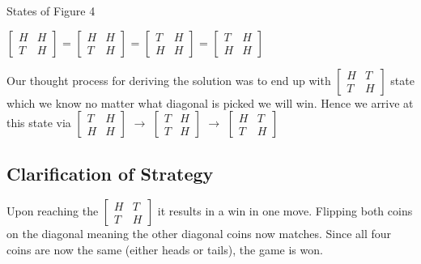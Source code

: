 \documentclass{article}
\begin{document}
\begin{center}
States of Figure 4
\end{center}
\begin{center} 
    $\begin{bmatrix}
        H & H \\
        T & H 
    \end{bmatrix}$
        =
    $\begin{bmatrix}
        H & H \\
        T & H 
    \end{bmatrix}$
        =
    $\begin{bmatrix}
        T & H \\
        H & H 
    \end{bmatrix}$
        =
    $\begin{bmatrix}
        T & H \\
        H & H 
    \end{bmatrix}$
\end{center}
Our thought process for deriving the solution was to end up with 
$\begin{bmatrix} 
        H & T \\
        T & H
        \end{bmatrix}$ state which we know no matter what diagonal is picked we will win. Hence we arrive at this state via $\begin{bmatrix}
        T & H \\
        H & H 
        \end{bmatrix}$ $\rightarrow$ $\begin{bmatrix} 

        T & H \\
        T & H 
        \end{bmatrix}$ $\rightarrow$  $\begin{bmatrix} 

        H & T \\
        T & H
        \end{bmatrix}$ 

\subsection*{Clarification of Strategy}

Upon reaching the $\begin{bmatrix} H & T \\
        T & H
        \end
        {bmatrix}$ it results in a win in one move. Flipping both coins on the diagonal
meaning the other diagonal coins now matches. Since all four coins are now the same (either heads or tails), the game is won.
\end{document}
